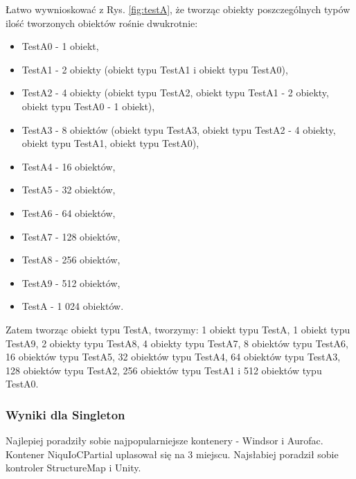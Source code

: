 \documentclass[12pt]{article}
\begin{document}
Łatwo wywnioskować z Rys. \ref{fig:testA}, że tworząc obiekty poszczególnych typów ilość tworzonych obiektów rośnie dwukrotnie:
\begin{itemize}
	\item TestA0 - 1 obiekt,
	\item TestA1 - 2 obiekty (obiekt typu TestA1 i obiekt typu TestA0),
	\item TestA2 - 4 obiekty (obiekt typu TestA2, obiekt typu TestA1 - 2 obiekty, obiekt typu TestA0 - 1 obiekt),
	\item TestA3 - 8 obiektów (obiekt typu TestA3, obiekt typu TestA2 - 4 obiekty, obiekt typu TestA1, obiekt typu TestA0),
	\item TestA4 - 16 obiektów,
	\item TestA5 - 32 obiektów,
	\item TestA6 - 64 obiektów,
	\item TestA7 - 128 obiektów,
	\item TestA8 - 256 obiektów,
	\item TestA9 - 512 obiektów,
	\item TestA - 1 024 obiektów.
\end{itemize}
Zatem tworząc obiekt typu TestA, tworzymy: 1 obiekt typu TestA, 1 obiekt typu TestA9, 2 obiekty typu TestA8, 4 obiekty typu TestA7, 8 obiektów typu TestA6, 16 obiektów typu TestA5, 32 obiektów typu TestA4, 64 obiektów typu TestA3, 128 obiektów typu TestA2, 256 obiektów typu TestA1 i 512 obiektów typu TestA0.

\subsubsection{Wyniki dla Singleton}
Najlepiej poradziły sobie najpopularniejsze kontenery - Windsor i Aurofac. Kontener NiquIoCPartial uplasował się na 3 miejscu. Najsłabiej poradził sobie kontroler StructureMap i Unity.
\end{document}
